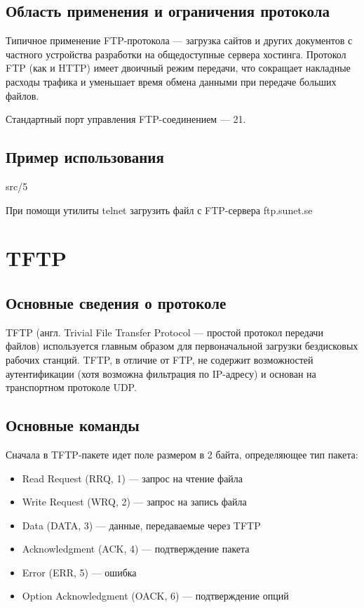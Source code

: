 \subsection{Область применения и ограничения протокола}
Типичное применение FTP-протокола — загрузка сайтов и других документов с частного устройства разработки на общедоступные сервера хостинга. Протокол FTP (как и HTTP) имеет двоичный режим передачи, что сокращает накладные расходы трафика и уменьшает время обмена данными при передаче больших файлов. 

Стандартный порт управления FTP-соединением — 21.

\subsection{Пример использования}
 {src/5}

При помощи утилиты telnet загрузить файл с FTP-сервера ftp.sunet.se

\section{TFTP}

\subsection{Основные сведения о протоколе}
TFTP (англ. Trivial File Transfer Protocol — простой протокол передачи файлов) используется главным образом для первоначальной загрузки бездисковых рабочих станций. TFTP, в отличие от FTP, не содержит возможностей аутентификации (хотя возможна фильтрация по IP-адресу) и основан на транспортном протоколе UDP. 

\subsection{Основные команды}
Сначала в TFTP-пакете идет поле размером в 2 байта, определяющее тип пакета:
\begin{itemize}
\item Read Request (RRQ, 1) — запрос на чтение файла
\item Write Request (WRQ, 2) — запрос на запись файла
\item Data (DATA, 3) — данные, передаваемые через TFTP
\item Acknowledgment (ACK, 4) — подтверждение пакета
\item Error (ERR, 5) — ошибка
\item Option Acknowledgment (OACK, 6) — подтверждение опций
\end{itemize}
    
